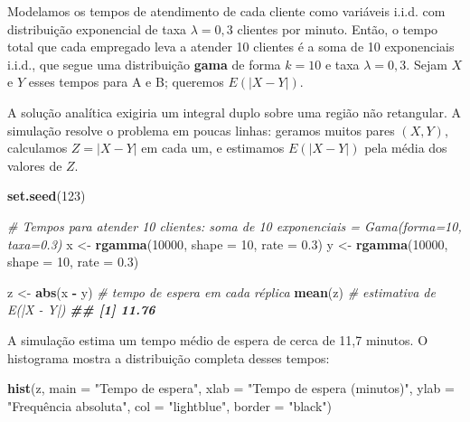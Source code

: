 \documentclass[
  portuguese,
  11pt,
  openany]{book}
\newenvironment{Shaded}{\begin{snugshade}}{\end{snugshade}}
\newcommand{\AttributeTok}[1]{\textcolor[rgb]{0.13,0.29,0.53}{#1}}
\newcommand{\CommentTok}[1]{\textcolor[rgb]{0.56,0.35,0.01}{\textit{#1}}}
\newcommand{\DecValTok}[1]{\textcolor[rgb]{0.00,0.00,0.81}{#1}}
\newcommand{\DocumentationTok}[1]{\textcolor[rgb]{0.56,0.35,0.01}{\textbf{\textit{#1}}}}
\newcommand{\FloatTok}[1]{\textcolor[rgb]{0.00,0.00,0.81}{#1}}
\newcommand{\FunctionTok}[1]{\textcolor[rgb]{0.13,0.29,0.53}{\textbf{#1}}}
\newcommand{\NormalTok}[1]{#1}
\newcommand{\OtherTok}[1]{\textcolor[rgb]{0.56,0.35,0.01}{#1}}
\newcommand{\SpecialCharTok}[1]{\textcolor[rgb]{0.81,0.36,0.00}{\textbf{#1}}}
\newcommand{\StringTok}[1]{\textcolor[rgb]{0.31,0.60,0.02}{#1}}
\begin{document}
Modelamos os tempos de atendimento de cada cliente como variáveis i.i.d. com
distribuição exponencial de taxa \(\lambda = 0{,}3\) clientes por minuto. Então, o tempo
total que cada empregado leva a atender 10 clientes é a soma de 10 exponenciais i.i.d.,
que segue uma distribuição \textbf{gama} de forma \(k = 10\) e taxa \(\lambda = 0{,}3\). Sejam
\(X\) e \(Y\) esses tempos para A e B; queremos \(E(|X - Y|)\).

A solução analítica exigiria um integral duplo sobre uma região não retangular. A
simulação resolve o problema em poucas linhas: geramos muitos pares \((X, Y)\), calculamos
\(Z = |X - Y|\) em cada um, e estimamos \(E(|X - Y|)\) pela média dos valores de \(Z\).

\begin{Shaded}
\begin{Highlighting}[]
\FunctionTok{set.seed}\NormalTok{(}\DecValTok{123}\NormalTok{)}

\CommentTok{\# Tempos para atender 10 clientes: soma de 10 exponenciais = Gama(forma=10, taxa=0.3)}
\NormalTok{x }\OtherTok{\textless{}{-}} \FunctionTok{rgamma}\NormalTok{(}\DecValTok{10000}\NormalTok{, }\AttributeTok{shape =} \DecValTok{10}\NormalTok{, }\AttributeTok{rate =} \FloatTok{0.3}\NormalTok{)}
\NormalTok{y }\OtherTok{\textless{}{-}} \FunctionTok{rgamma}\NormalTok{(}\DecValTok{10000}\NormalTok{, }\AttributeTok{shape =} \DecValTok{10}\NormalTok{, }\AttributeTok{rate =} \FloatTok{0.3}\NormalTok{)}

\NormalTok{z }\OtherTok{\textless{}{-}} \FunctionTok{abs}\NormalTok{(x }\SpecialCharTok{{-}}\NormalTok{ y)      }\CommentTok{\# tempo de espera em cada réplica}
\FunctionTok{mean}\NormalTok{(z)              }\CommentTok{\# estimativa de E(|X {-} Y|)}
\DocumentationTok{\#\# [1] 11.76}
\end{Highlighting}
\end{Shaded}

A simulação estima um tempo médio de espera de cerca de 11,7 minutos. O histograma
mostra a distribuição completa desses tempos:

\begin{Shaded}
\begin{Highlighting}[]
\FunctionTok{hist}\NormalTok{(z,}
     \AttributeTok{main =} \StringTok{"Tempo de espera"}\NormalTok{,}
     \AttributeTok{xlab =} \StringTok{"Tempo de espera (minutos)"}\NormalTok{,}
     \AttributeTok{ylab =} \StringTok{"Frequência absoluta"}\NormalTok{,}
     \AttributeTok{col =} \StringTok{"lightblue"}\NormalTok{, }\AttributeTok{border =} \StringTok{"black"}\NormalTok{)}
\end{Highlighting}
\end{Shaded}
\end{document}

